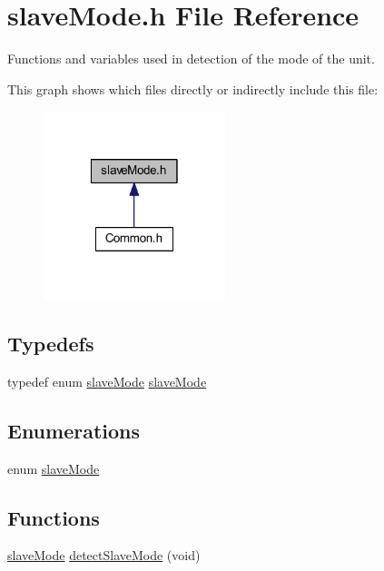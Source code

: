 \hypertarget{a00047}{\section{slave\-Mode.\-h File Reference}
\label{a00047}
}


Functions and variables used in detection of the mode of the unit.  


This graph shows which files directly or indirectly include this file\-:\nopagebreak
\begin{figure}[H]
\begin{center}
\leavevmode
\includegraphics[width=150pt]{a00076}
\end{center}
\end{figure}
\subsection*{Typedefs}
\begin{DoxyCompactItemize}
\item 
typedef enum \hyperlink{a00047_aca06f1f459e3a5a5af6da9c575e60754}{slave\-Mode} \hyperlink{a00047_afb2b17d98c0aab4c05960f280d68084d}{slave\-Mode}
\end{DoxyCompactItemize}
\subsection*{Enumerations}
\begin{DoxyCompactItemize}
\item 
enum \hyperlink{a00047_aca06f1f459e3a5a5af6da9c575e60754}{slave\-Mode} 
\end{DoxyCompactItemize}
\subsection*{Functions}
\begin{DoxyCompactItemize}
\item 
\hyperlink{a00047_aca06f1f459e3a5a5af6da9c575e60754}{slave\-Mode} \hyperlink{a00047_ac6755edae0bbfd8297081fcdc57ec18f}{detect\-Slave\-Mode} (void)
\end{DoxyCompactItemize}
